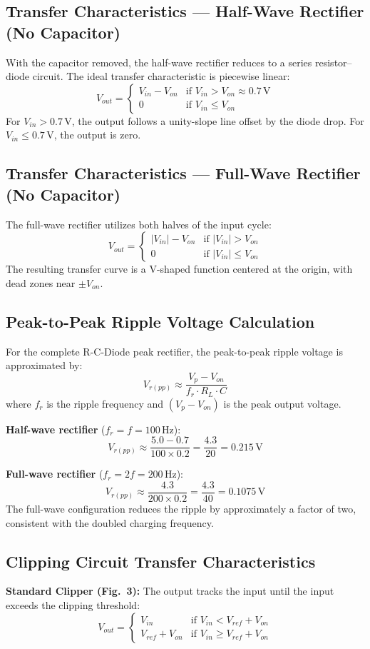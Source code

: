 \documentclass[12pt, letterpaper]{article}
\begin{document}
\subsection{Transfer Characteristics --- Half-Wave Rectifier (No Capacitor)}
With the capacitor removed, the half-wave rectifier reduces to a series resistor--diode circuit. The ideal transfer characteristic is piecewise linear:
\[
V_{out} =
\begin{cases}
V_{in} - V_{on} & \text{if } V_{in} > V_{on} \approx 0.7\,\text{V} \\
0 & \text{if } V_{in} \leq V_{on}
\end{cases}
\]
For $V_{in} > 0.7\,\text{V}$, the output follows a unity-slope line offset by the diode drop. For $V_{in} \leq 0.7\,\text{V}$, the output is zero.

\subsection{Transfer Characteristics --- Full-Wave Rectifier (No Capacitor)}
The full-wave rectifier utilizes both halves of the input cycle:
\[
V_{out} =
\begin{cases}
|V_{in}| - V_{on} & \text{if } |V_{in}| > V_{on} \\
0 & \text{if } |V_{in}| \leq V_{on}
\end{cases}
\]
The resulting transfer curve is a V-shaped function centered at the origin, with dead zones near $\pm V_{on}$.

\subsection{Peak-to-Peak Ripple Voltage Calculation}
For the complete R-C-Diode peak rectifier, the peak-to-peak ripple voltage is approximated by:
\[
V_{r(pp)} \approx \frac{V_p - V_{on}}{f_r \cdot R_L \cdot C}
\]
where $f_r$ is the ripple frequency and $(V_p - V_{on})$ is the peak output voltage.

\textbf{Half-wave rectifier} ($f_r = f = 100\,\text{Hz}$):
\[
V_{r(pp)} \approx \frac{5.0 - 0.7}{100 \times 0.2} = \frac{4.3}{20} = 0.215\,\text{V}
\]

\textbf{Full-wave rectifier} ($f_r = 2f = 200\,\text{Hz}$):
\[
V_{r(pp)} \approx \frac{4.3}{200 \times 0.2} = \frac{4.3}{40} = 0.1075\,\text{V}
\]
The full-wave configuration reduces the ripple by approximately a factor of two, consistent with the doubled charging frequency.

\subsection{Clipping Circuit Transfer Characteristics}
\textbf{Standard Clipper (Fig.~3):}
The output tracks the input until the input exceeds the clipping threshold:
\[
V_{out} =
\begin{cases}
V_{in} & \text{if } V_{in} < V_{ref} + V_{on} \\
V_{ref} + V_{on} & \text{if } V_{in} \geq V_{ref} + V_{on}
\end{cases}
\]
\end{document}
